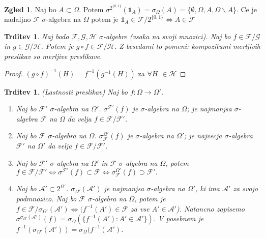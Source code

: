 \documentclass[a4paper,12pt]{article}
\theoremstyle{definition} %
\newtheorem{zgled}[definicija]{Zgled}
\theoremstyle{plain} %
\newtheorem{trditev}[definicija]{Trditev}
\newcommand{\F}{\mathcal{F}}
\newcommand{\A}{\mathcal{A}}
\begin{document}
            \begin{zgled}
                Naj bo $A \subset \Omega$. Potem $\sigma^{2^{\{0, 1\}}}(\mathds{1}_A) = \sigma_\Omega (A) = \{\emptyset, \Omega, A, \Omega\backslash A\}$. Ce je nadaljno $\F$ $\sigma$-algebra na $\Omega$ potem je  $\mathds{1}_A \in \F/2^{\{0, 1\}} \iff A \in \F$ 
            \end{zgled}

            \begin{trditev}
                Naj bodo $\F, \mathcal{G}, \mathcal{H}$ $\sigma$-algebre (vsaka na svoji mnozici). Naj bo $f \in \F/\mathcal{G}$ in $g \in \mathcal{G}/\mathcal{H}$. Potem je $g \circ f \in \F/\mathcal{H}.$ Z besedami to pomeni: kompozitumi merljivih preslikav so merljive preslikave.
            \end{trditev}

            \begin{proof}
                $(g \circ f)^{-1}(H) = f^{-1}(g^{-1}(H))$ za $\forall H$ $\in \mathcal{H}$
            \end{proof}

            \begin{trditev} (Lastnosti preslikav)
                Naj bo $f: \Omega \rightarrow \Omega'$.
                \begin{enumerate}
                    \item Naj bo $\F'$ $\sigma$-algebra na $\Omega'$. $\sigma^{\F'}(f)$ je $\sigma$-algebra na $\Omega$; je najmanjsa $\sigma$-algebra $\mathcal{F}$ na $\Omega$ da velja $f \in \mathcal{F}/\F'$.
                    \item Naj bo $\F$ $\sigma$-algebra na $\Omega$. $\sigma_{\F}^{\Omega'}(f)$ je $\sigma$-algebra na $\Omega'$; je najvecja $\sigma$-algebra $\mathcal{F}'$ na $\Omega'$ da velja $f \in \mathcal{F}/\F'$.
                    \item Naj bo $\F'$ $\sigma$-algebra na $\Omega'$ in $\F$ $\sigma$-algebra na $\Omega$, potem $f \in \F/\F' \iff \sigma^{\F'}(f) \subset \F \iff \sigma_{\F}^{\Omega'}(f) \supset \F'.$
                    \item Naj bo $\A' \subset 2^{\Omega'}$. $\sigma_{\Omega'}(\A')$ je najmanjsa $\sigma$-algebra na $\Omega'$, ki ima $\A'$ za svojo podmnozico. Naj bo $\F$ $\sigma$-algebra na $\Omega$, potem je $f \in \F/\sigma_{\Omega'}(\A') \iff (f^{-1}(A') \in \F$ za vse $A' \in \A'$). Natancno zapisemo $\sigma^{\sigma_{\Omega'}(\A')}(f) = \sigma_\Omega(\{f^{-1}(A'):A' \in \A'\})$. V posebnem je $f^{-1}(\sigma_{\Omega '}(\A ')) = \sigma_{\Omega}(f^{-1}(\A').$
                \end{enumerate}
            \end{trditev}
\end{document}
